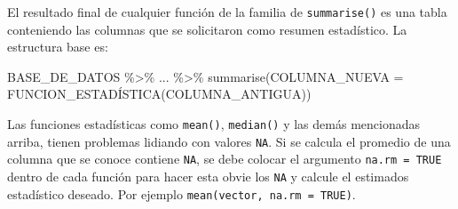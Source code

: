 \documentclass[
]{article}
\newenvironment{Shaded}{\begin{snugshade}}{\end{snugshade}}
\newcommand{\AttributeTok}[1]{\textcolor[rgb]{0.77,0.63,0.00}{#1}}
\newcommand{\FunctionTok}[1]{\textcolor[rgb]{0.00,0.00,0.00}{#1}}
\newcommand{\NormalTok}[1]{#1}
\newcommand{\SpecialCharTok}[1]{\textcolor[rgb]{0.00,0.00,0.00}{#1}}
\theoremstyle{definition}
\theoremstyle{definition}
\theoremstyle{definition}
\theoremstyle{definition}
\theoremstyle{remark}
\begin{document}
El resultado final de cualquier función de la familia de \texttt{summarise()} es una tabla conteniendo las columnas que se solicitaron como resumen estadístico. La estructura base es:

\begin{Shaded}
\begin{Highlighting}[]
\NormalTok{BASE\_DE\_DATOS }\SpecialCharTok{\%\textgreater{}\%}\NormalTok{ ... }\SpecialCharTok{\%\textgreater{}\%} 
  \FunctionTok{summarise}\NormalTok{(}\AttributeTok{COLUMNA\_NUEVA =}\NormalTok{ FUNCION\_ESTADÍSTICA(COLUMNA\_ANTIGUA))}
\end{Highlighting}
\end{Shaded}

\begin{rmdtip}
Las funciones estadísticas como \texttt{mean()}, \texttt{median()} y las demás mencionadas arriba, tienen problemas lidiando con valores \texttt{NA}. Si se calcula el promedio de una columna que se conoce contiene \texttt{NA}, se debe colocar el argumento \texttt{na.rm\ =\ TRUE} dentro de cada función para hacer esta obvie los \texttt{NA} y calcule el estimados estadístico deseado. Por ejemplo \texttt{mean(vector,\ na.rm\ =\ TRUE)}.
\end{rmdtip}
\end{document}
